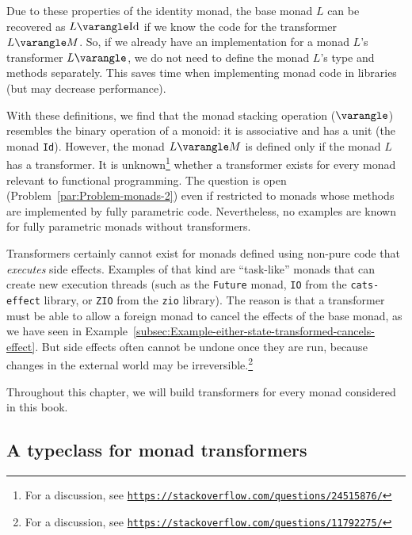 Due to these properties of the identity monad, the base monad $L$
can be recovered as $L\varangle\text{Id}$ if we know the code for
the transformer $L\varangle M$. So, if we already have an implementation
for a monad $L$\textsf{'}s transformer $L\varangle$, we do not need to define
the monad $L$\textsf{'}s type and methods separately. This saves time when
implementing monad code in libraries (but may decrease performance).

With these definitions, we find that the monad stacking operation
($\varangle$) resembles the binary operation of a monoid: it is associative
and has a unit (the monad \lstinline!Id!). However, the monad $L\varangle M$
is defined only if the monad $L$ has a transformer. It is unknown\footnote{For a discussion, see \texttt{\href{https://stackoverflow.com/questions/24515876/}{https://stackoverflow.com/questions/24515876/}}}
whether a transformer exists for every monad relevant to functional
programming. The question is open (Problem~\ref{par:Problem-monads-2})
even if restricted to monads whose methods are implemented by fully
parametric code. Nevertheless, no examples are known for fully parametric
monads without transformers.

Transformers certainly cannot exist for monads defined using non-pure
code that \emph{executes} side effects. Examples of that kind are
\textsf{``}task-like\textsf{''} monads that can create new execution threads (such
as the \lstinline!Future! monad, \lstinline!IO! from the \lstinline!cats-effect!
library, or \lstinline!ZIO! from the \lstinline!zio! library). The
reason is that a transformer must be able to allow a foreign monad
to cancel the effects of the base monad, as we have seen in Example~\ref{subsec:Example-either-state-transformed-cancels-effect}.
But side effects often cannot be undone once they are run, because
changes in the external world may be irreversible.\footnote{For a discussion, see \texttt{\href{https://stackoverflow.com/questions/11792275/}{https://stackoverflow.com/questions/11792275/}}} 

Throughout this chapter, we will build transformers for every monad
considered in this book.

\subsection{A typeclass for monad transformers\label{subsec:A-typeclass-for-monad-transformers}}

